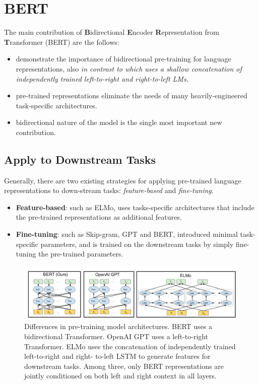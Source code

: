\documentclass[a3paper, 12pt]{book} %
\begin{document}
\section{BERT}
The main contribution of \textbf{B}idirectional \textbf{E}ncoder \textbf{R}epresentation from \textbf{T}ransformer (BERT) are the follows:
\begin{itemize}
	\item demonstrate the importance of bidirectional pre-training for language representations, also \emph{in contrast to \citep{peters2018deep} which uses a shallow concatenation of independently trained left-to-right and right-to-left LMs.} 
	\item pre-trained representations eliminate the needs of many heavily-engineered task-specific architectures.
	\item bidirectional nature of the model is the single most important new contribution.
\end{itemize}

\subsection{Apply to Downstream Tasks}
Generally, there are two existing strategies for applying pre-trained language representations to down-stream tasks: \emph{feature-based} and \emph{fine-tuning}.

\begin{itemize}
	\item \textbf{Feature-based}: such as ELMo, uses tasks-specific architectures that include the pre-trained representations as additional features.
	\item \textbf{Fine-tuning}: such as Skip-gram, GPT and BERT, introduced minimal task-specific parameters, and is trained on the downstream  tasks by simply fine-tuning the pre-trained parameters.
\end{itemize}

\begin{figure}[htpb]
	\centering
	\includegraphics[width=\linewidth]{figures/diff_bert_gpt_emlo.png}
	\caption{Differences in pre-training model architectures. BERT uses a bidirectional Transformer. OpenAI GPT uses a left-to-right Transformer. ELMo uses the concatenation of independently trained left-to-right and right- to-left LSTM to generate features for downstream tasks. Among three, only BERT representations are jointly conditioned on both left and right context in all layers.}
	\label{fig:diff_bert_gpt_emlo}
\end{figure}
\end{document}

